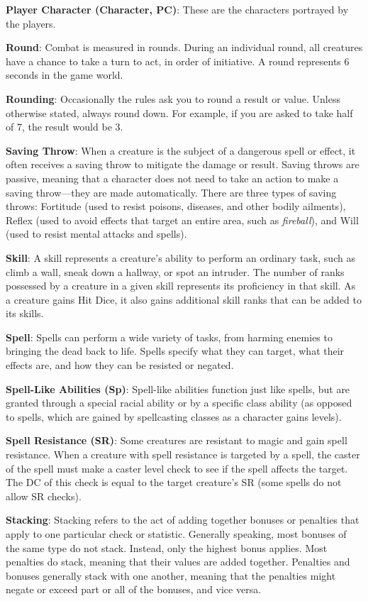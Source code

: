 \textbf{Player Character (Character, PC)}: These are the characters portrayed by the players.
				
\textbf{Round}: Combat is measured in rounds. During an individual round, all creatures have a chance to take a turn to act, in order of initiative. A round represents 6 seconds in the game world.
				
\textbf{Rounding}: Occasionally the rules ask you to round a result or value. Unless otherwise stated, always round down. For example, if you are asked to take half of 7, the result would be 3.
				
\textbf{Saving Throw}: When a creature is the subject of a dangerous spell or effect, it often receives a saving throw to mitigate the damage or result. Saving throws are passive, meaning that a character does not need to take an action to make a saving throw---they are made automatically. There are three types of saving throws: Fortitude (used to resist poisons, diseases, and other bodily ailments), Reflex (used to avoid effects that target an entire area, such as \textit{fireball}), and Will (used to resist mental attacks and spells).
				
\textbf{Skill}: A skill represents a creature's ability to perform an ordinary task, such as climb a wall, sneak down a hallway, or spot an intruder. The number of ranks possessed by a creature in a given skill represents its proficiency in that skill. As a creature gains Hit Dice, it also gains additional skill ranks that can be added to its skills. 
				
\textbf{Spell}: Spells can perform a wide variety of tasks, from harming enemies to bringing the dead back to life. Spells specify what they can target, what their effects are, and how they can be resisted or negated.
				
\textbf{Spell-Like Abilities (Sp)}: Spell-like abilities function just like spells, but are granted through a special racial ability or by a specific class ability (as opposed to spells, which are gained by spellcasting classes as a character gains levels).
				
\textbf{Spell Resistance (SR)}: Some creatures are resistant to magic and gain spell resistance. When a creature with spell resistance is targeted by a spell, the caster of the spell must make a caster level check to see if the spell affects the target. The DC of this check is equal to the target creature's SR (some spells do not allow SR checks).
				
\textbf{Stacking}: Stacking refers to the act of adding together bonuses or penalties that apply to one particular check or statistic. Generally speaking, most bonuses of the same type do not stack. Instead, only the highest bonus applies. Most penalties do stack, meaning that their values are added together. Penalties and bonuses generally stack with one another, meaning that the penalties might negate or exceed part or all of the bonuses, and vice versa.
				
